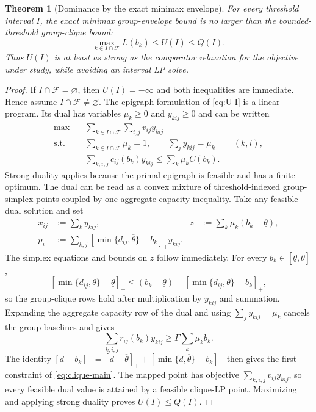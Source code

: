 \documentclass[11pt]{article}
\theoremstyle{plain}
\newtheorem{theorem}{Theorem}
\theoremstyle{definition}
\theoremstyle{remark}
\newcommand{\pos}[1]{[#1]_+}
\begin{document}
\begin{theorem}[Dominance by the exact minimax envelope]\label{thm:dominance}
For every threshold interval $I$, the exact minimax group-envelope bound is no larger than the bounded-threshold group-clique bound:
\[
\max_{k\in I\cap\mathcal F}L(b_k)\le U(I)\le Q(I).
\]
Thus $U(I)$ is at least as strong as the comparator relaxation for the objective under study, while avoiding an interval LP solve.
\end{theorem}
\begin{proof}
If $I\cap\mathcal F=\varnothing$, then $U(I)=-\infty$ and both inequalities are immediate.  Hence assume $I\cap\mathcal F\ne\varnothing$.
The epigraph formulation of \eqref{eq:U-I} is a linear program.  Its dual has variables $\mu_k\ge0$ and $y_{kij}\ge0$ and can be written
\begin{align*}
\max\quad &\sum_{k\in I\cap\mathcal F}\sum_{i,j}v_{ij}y_{kij}\\
\text{s.t.}\quad
&\sum_{k\in I\cap\mathcal F}\mu_k=1,\qquad
\sum_jy_{kij}=\mu_k &&(k,i),\\
&\sum_{k,i,j}c_{ij}(b_k)y_{kij}
 \le\sum_k\mu_k C(b_k).
\end{align*}
Strong duality applies because the primal epigraph is feasible and has a finite optimum.  The dual can be read as a convex mixture of threshold-indexed group-simplex points coupled by one aggregate capacity inequality.  Take any feasible dual solution and set
\begin{align*}
x_{ij}&:=\sum_k y_{kij},
&z&:=\sum_k\mu_k(b_k-\underline\theta),\\
p_i&:=\sum_{k,j}\pos{\min\{d_{ij},\overline\theta\}-b_k}y_{kij}.
\end{align*}
The simplex equations and bounds on $z$ follow immediately.  For every $b_k\in[\underline\theta,\overline\theta]$,
\[
\pos{\min\{d_{ij},\overline\theta\}-\underline\theta}
\le (b_k-\underline\theta)
+\pos{\min\{d_{ij},\overline\theta\}-b_k},
\]
so the group-clique rows hold after multiplication by $y_{kij}$ and summation.  Expanding the aggregate capacity row of the dual and using $\sum_jy_{kij}=\mu_k$ cancels the group baselines and gives
\[
\sum_{k,i,j}r_{ij}(b_k)y_{kij}\ge
\Gamma\sum_k\mu_k b_k.
\]
The identity
$\pos{d-b_k}=\pos{d-\overline\theta}+\pos{\min\{d,\overline\theta\}-b_k}$
then gives the first constraint of \eqref{eq:clique-main}.  The mapped point has objective $\sum_{k,i,j}v_{ij}y_{kij}$, so every feasible dual value is attained by a feasible clique-LP point.  Maximizing and applying strong duality proves $U(I)\le Q(I)$.
\end{proof}
\end{document}
